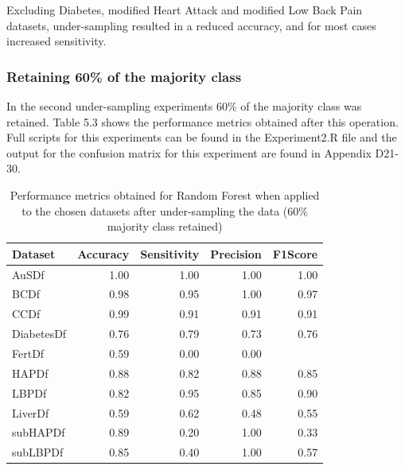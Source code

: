 Excluding Diabetes, modified Heart Attack and modified Low Back Pain datasets, under-sampling resulted in a reduced accuracy, and for most cases increased sensitivity. 


\subsubsection{Retaining 60\% of the majority class}
In the second under-sampling experiments 60\% of the majority class was retained. Table 5.3 shows the performance metrics obtained after this operation. Full scripts for this experiments can be found in the Experiment2.R file and the output for the confusion matrix for this experiment are found in Appendix D21-30.

\begin{table}[ht]
\centering
\begin{tabular}{lrrrr}
  \hline
  \rowcolor{LightCyan}
Dataset & Accuracy & Sensitivity & Precision & F1Score \\ 
  \hline
AuSDf & 1.00 & 1.00 & 1.00 & 1.00 \\ 
  BCDf & 0.98 & 0.95 & 1.00 & 0.97 \\ 
  CCDf & 0.99 & 0.91 & 0.91 & 0.91 \\ 
  DiabetesDf & 0.76 & 0.79 & 0.73 & 0.76 \\ 
  FertDf & 0.59 & 0.00 & 0.00 &  \\ 
  HAPDf & 0.88 & 0.82 & 0.88 & 0.85 \\ 
  LBPDf & 0.82 & 0.95 & 0.85 & 0.90 \\ 
  LiverDf & 0.59 & 0.62 & 0.48 & 0.55 \\ 
  subHAPDf & 0.89 & 0.20 & 1.00 & 0.33 \\ 
  subLBPDf & 0.85 & 0.40 & 1.00 & 0.57 \\ 
   \hline
\end{tabular}
\caption{Performance metrics obtained for Random Forest when applied to the chosen datasets after under-sampling the data (60\% majority class retained)}
\end{table}

